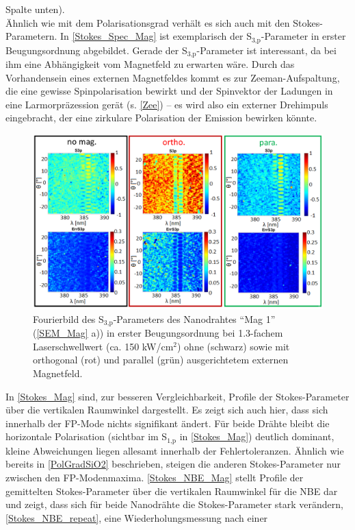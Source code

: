 Spalte unten).\\ Ähnlich wie mit dem Polarisationsgrad verhält es sich auch mit
den Stokes-Parametern. In \autoref{Stokes_Spec_Mag} ist exemplarisch der
S$_\text{3,p}$-Parameter in erster Beugungsordnung abgebildet. Gerade der
S$_\text{3,p}$-Parameter ist interessant, da bei ihm eine Abhängigkeit vom
Magnetfeld zu erwarten wäre. Durch das Vorhandensein eines externen Magnetfeldes
kommt es zur Zeeman-Aufspaltung, die eine gewisse Spinpolarisation bewirkt und
der Spinvektor der Ladungen in eine Larmorpräzession gerät (s. \autoref{Zee}) –
es wird also ein externer Drehimpuls eingebracht, der eine zirkulare
Polarisation der Emission bewirken könnte.\begin{figure}[h] \centering
\includegraphics[width=.85\textwidth]{Bilder/Mag/Stokes_Spec_Mag}
\caption{Fourierbild des S$_\text{3,p}$-Parameters des Nanodrahtes ``Mag 1''
(\autoref{SEM_Mag} a)) in erster Beugungsordnung bei 1.3-fachem Laserschwellwert
(ca. 150 kW/cm$^\text{2}$) ohne (schwarz) sowie mit orthogonal (rot) und
parallel (grün) ausgerichtetem externen Magnetfeld.} \label{Stokes_Spec_Mag}
\centering \end{figure} In \autoref{Stokes_Mag} sind, zur besseren
Vergleichbarkeit, Profile der Stokes-Parameter über die vertikalen Raumwinkel
dargestellt. Es zeigt sich auch hier, dass sich innerhalb der FP-Mode nichts
signifikant ändert. Für beide Drähte bleibt die horizontale Polarisation
(sichtbar im S$_\text{1,p}$ in \autoref{Stokes_Mag}) deutlich dominant, kleine
Abweichungen liegen allesamt innerhalb der Fehlertoleranzen. Ähnlich wie bereits
in \autoref{PolGradSiO2} beschrieben, steigen die anderen Stokes-Parameter nur
zwischen den FP-Modenmaxima. \autoref{Stokes_NBE_Mag} stellt Profile der
gemittelten Stokes-Parameter über die vertikalen Raumwinkel für die NBE dar und
zeigt, dass sich für beide Nanodrähte die Stokes-Parameter stark verändern,
\autoref{Stokes_NBE_repeat}, eine Wiederholungsmessung nach einer
